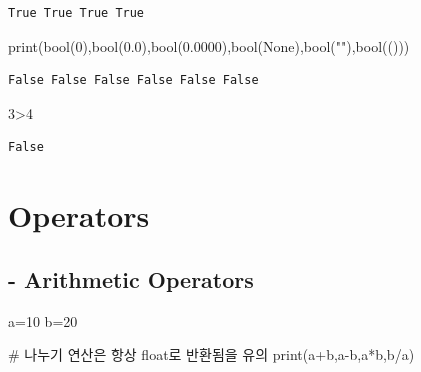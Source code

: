 \documentclass[
  a4paper,
  DIV=11,
  numbers=noendperiod]{scrreprt}
\newenvironment{Shaded}{\begin{snugshade}}{\end{snugshade}}
\newcommand{\BuiltInTok}[1]{\textcolor[rgb]{0.00,0.23,0.31}{#1}}
\newcommand{\CommentTok}[1]{\textcolor[rgb]{0.37,0.37,0.37}{#1}}
\newcommand{\DecValTok}[1]{\textcolor[rgb]{0.68,0.00,0.00}{#1}}
\newcommand{\FloatTok}[1]{\textcolor[rgb]{0.68,0.00,0.00}{#1}}
\newcommand{\NormalTok}[1]{\textcolor[rgb]{0.00,0.23,0.31}{#1}}
\newcommand{\OperatorTok}[1]{\textcolor[rgb]{0.37,0.37,0.37}{#1}}
\newcommand{\StringTok}[1]{\textcolor[rgb]{0.13,0.47,0.30}{#1}}
\newcommand{\VariableTok}[1]{\textcolor[rgb]{0.07,0.07,0.07}{#1}}
\begin{document}
\begin{verbatim}
True True True True
\end{verbatim}

\begin{Shaded}
\begin{Highlighting}[]
\BuiltInTok{print}\NormalTok{(}\BuiltInTok{bool}\NormalTok{(}\DecValTok{0}\NormalTok{),}\BuiltInTok{bool}\NormalTok{(}\FloatTok{0.0}\NormalTok{),}\BuiltInTok{bool}\NormalTok{(}\FloatTok{0.0000}\NormalTok{),}\BuiltInTok{bool}\NormalTok{(}\VariableTok{None}\NormalTok{),}\BuiltInTok{bool}\NormalTok{(}\StringTok{""}\NormalTok{),}\BuiltInTok{bool}\NormalTok{(()))}
\end{Highlighting}
\end{Shaded}

\begin{verbatim}
False False False False False False
\end{verbatim}

\begin{Shaded}
\begin{Highlighting}[]
\DecValTok{3}\OperatorTok{\textgreater{}}\DecValTok{4}
\end{Highlighting}
\end{Shaded}

\begin{verbatim}
False
\end{verbatim}

\section{Operators}\label{operators}

\subsection{- Arithmetic Operators}\label{arithmetic-operators}

\begin{Shaded}
\begin{Highlighting}[]
\NormalTok{a}\OperatorTok{=}\DecValTok{10}
\NormalTok{b}\OperatorTok{=}\DecValTok{20}
\end{Highlighting}
\end{Shaded}

\begin{Shaded}
\begin{Highlighting}[]
\CommentTok{\# 나누기 연산은 항상 float로 반환됨을 유의}
\BuiltInTok{print}\NormalTok{(a}\OperatorTok{+}\NormalTok{b,a}\OperatorTok{{-}}\NormalTok{b,a}\OperatorTok{*}\NormalTok{b,b}\OperatorTok{/}\NormalTok{a)}
\end{Highlighting}
\end{Shaded}
\end{document}
